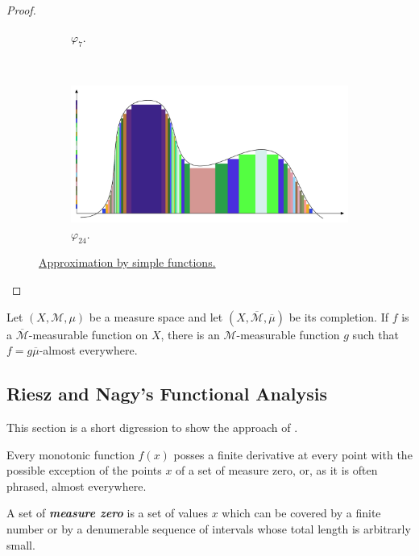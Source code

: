 \documentclass{article}
\theoremstyle{definition}
\numberwithin{equation}{section}
\begin{document}
\begin{itemize}
\begin{proof}
\begin{figure}[H]
\begin{center}
\begin{subfigure}{\linewidth}
	\caption{$\varphi_7$.}
	\label{fig:simple-functions1}
\end{subfigure}
\\
	\begin{subfigure}{\linewidth}
	\centering
	\includegraphics[width=1\linewidth]{fig2}
	\caption{$\varphi_{24}$.}
	\label{fig:simple-functions2}
\end{subfigure}
\end{center}
\caption{\href{https://tex.stackexchange.com/questions/667646/lebesgue-integral-on-tikz}{Approximation by simple functions.}}
\end{figure}
		\end{proof}
		\begin{prop}
			Let $(X,\mathcal{M},\mu)$ be a measure space and let $(X,\overline{\mathcal{M}},\overline{\mu})$ be its completion. If $f$ is a $\overline{\mathcal{M}}$-measurable function on $X$, there is an $\mathcal{M}$-measurable function $g$ such that $f=g\overline{\mu}$-almost everywhere.
		\end{prop}
		\end{itemize}
	\subsection{Riesz and Nagy's Functional Analysis}
		This section is a short digression to show the approach of \cite{riesz}.
		\begin{thm}[Lebesgue]
			Every monotonic function $f(x)$ posses a finite derivative at every point with the possible exception of the points $x$ of a set of measure zero, or, as it is often phrased, almost everywhere.
		\end{thm}
		A set of \textbf{\textit{measure zero}} is a set of values $x$ which can be covered by a finite number or by a denumerable sequence of intervals whose total length is arbitrarly small.
		
\end{document}
